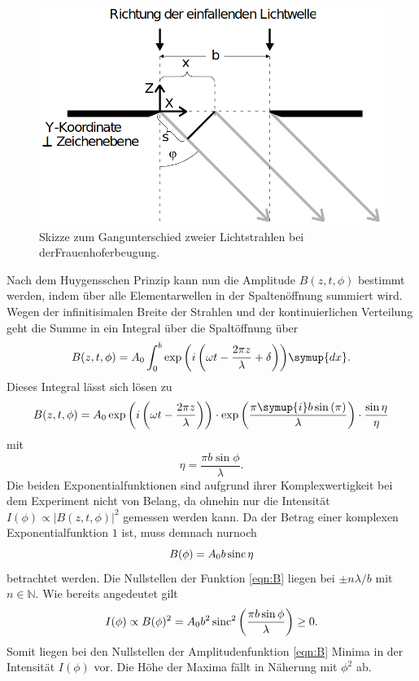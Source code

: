 \begin{figure}[H]
    \centering
    \includegraphics[scale = 0.45]{pictures/frauenhofer2.png}
    \caption{Skizze zum Gangunterschied zweier Lichtstrahlen bei derFrauenhoferbeugung. \cite{AP01}}
    \label{fig:frauenhofer2}
\end{figure}

\noindent
Nach dem Huygensschen Prinzip kann nun die Amplitude $B(z,t,\phi)$ bestimmt werden, indem über alle Elementarwellen
in der Spaltenöffnung summiert wird. Wegen der infinitisimalen Breite der Strahlen und der kontinuierlichen Verteilung geht die Summe in ein
Integral über die Spaltöffnung über
\begin{equation*}
    B(z,t,\phi)=A_0\int_0^b{\exp{\left(i\left(\omega t-\frac{2\pi z}{\lambda}+\delta\right)\right)}\symup{dx}}    .
\end{equation*}
Dieses Integral lässt sich lösen zu
\begin{equation*}
    B(z,t,\phi) = A_0\exp{\left(i\left(\omega t-\frac{2 \pi z}{\lambda}\right)\right)}
                \cdot\exp{\left(\frac{\pi \symup{i} b \sin{(\pi)}}{\lambda}\right)}
                \cdot\frac{\sin{\eta}}{\eta}
\end{equation*}
mit
\begin{equation*}
    \eta=\frac{\pi b \sin{\phi}}{\lambda}   .
\end{equation*}
Die beiden Exponentialfunktionen sind aufgrund ihrer Komplexwertigkeit bei dem Experiment nicht von Belang, da ohnehin nur
die Intensität $I(\phi)\propto |B(z,t,\phi)|^2$ gemessen werden kann. Da der Betrag einer komplexen Exponentialfunktion $\num{1}$ ist, muss
demnach nurnoch
\begin{equation}
    B(\phi)=A_0b\operatorname{sinc}{\eta}
    \label{eqn:B}
\end{equation}
betrachtet werden. Die Nullstellen der Funktion \eqref{eqn:B} liegen bei $\pm n\lambda/b$ mit $n \in \mathbb{N}$.
Wie bereits angedeutet gilt
\begin{equation}
    I(\phi)\propto B(\phi)^2=
    A_0b^2\operatorname{sinc}^2{\left(\frac{\pi b \sin{\phi}}{\lambda}\right)}
    \geq 0  .
    \label{eqn:intensität1}
\end{equation}
Somit liegen bei den Nullstellen der Amplitudenfunktion \ref{eqn:B} Minima in der Intensität $I(\phi)$ vor. Die Höhe der Maxima fällt in
Näherung mit $\phi^2$ ab.

